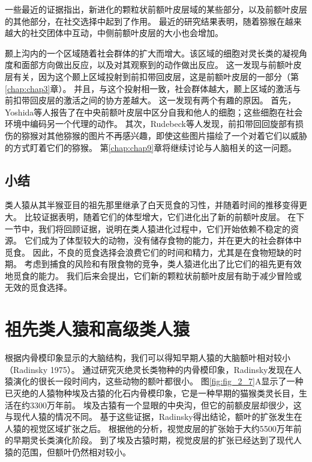一些最近的证据指出，新进化的颗粒状前额叶皮层域的某些部分，以及前额叶皮层的其他部分，在社交选择中起到了作用。
最近的研究结果表明，随着猕猴在越来越大的社交团体中互动，中侧前额叶皮层的大小也会增加\cite{sallet2011social}。


颞上沟内的一个区域随着社会群体的扩大而增大。该区域的细胞对灵长类的凝视角度和面部方向做出反应\cite{perrett1985visual}，以及对其观察到的动作做出反应\cite{jellema2003cells}。
这一发现与前额叶皮层有关，因为这个颞上区域投射到前扣带回皮层，这是前额叶皮层的一部分（第\ref{chap:chap3}章）。
并且，与这个投射相一致，社会群体越大，颞上区域的激活与前扣带回皮层的激活之间的协方差越大\cite{sallet2011social}。
这一发现有两个有趣的原因。
首先，Yoshida等人\cite{yoshida2011representation}报告了在中央前额叶皮层中区分自我和他人的细胞；这些细胞在社会环境中编码另一个代理的动作。
其次，Rudebeck等人\cite{rudebeck2006role}发现，前扣带回回旋部有损伤的猕猴对其他猕猴的图片不再感兴趣，即使这些图片描绘了一个对着它们以威胁的方式盯着它们的猕猴。
第\ref{chap:chap9}章将继续讨论与人脑相关的这一问题。



\subsection{小结}

类人猿从其半猴亚目的祖先那里继承了白天觅食的习性，并随着时间的推移变得更大。
比较证据表明，随着它们的体型增大，它们进化出了新的前额叶皮层。
在下一节中，我们将回顾证据，说明在类人猿进化过程中，它们开始依赖不稳定的资源。
它们成为了体型较大的动物，没有储存食物的能力，并在更大的社会群体中觅食。
因此，不良的觅食选择会浪费它们的时间和精力，尤其是在食物短缺的时期。
考虑到捕食的风险和有限食物的竞争，类人猿进化出了比它们的祖先更有效地觅食的能力。
我们后来会提出，它们新的颗粒状前额叶皮层有助于减少冒险或无效的觅食选择。



\section{祖先类人猿和高级类人猿}

根据内骨模印象显示的大脑结构，我们可以得知早期人猿的大脑额叶相对较小\cite{radinsky1979fossil}（Radinsky 1975）。
通过研究灭绝灵长类物种的内骨模印象，Radinsky发现在人猿演化的很长一段时间内，这些动物的额叶都很小。
图\ref{fig:fig_2_7}A显示了一种已灭绝的人猿物种埃及古猿的化石内骨模印象，它是一种早期的猫猴类灵长目，生活在约3300万年前\cite{kay2004anthropoid}。
埃及古猿有一个显眼的中央沟，但它的前额皮层却很少，这与现代人猿的情况不同。
基于这些证据，Radinsky得出结论，额叶的扩张发生在人猿的视觉区域扩张之后。
根据他的分析，视觉皮层的扩张始于大约5500万年前的早期灵长类演化阶段。
到了埃及古猿时期，视觉皮层的扩张已经达到了现代人猿的范围，但额叶仍然相对较小。


